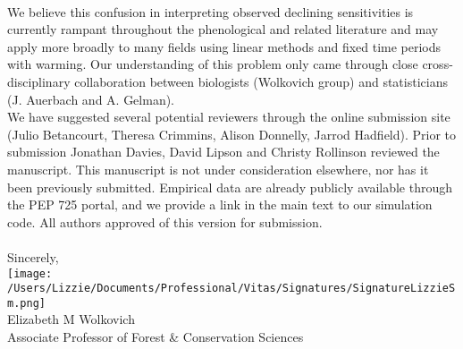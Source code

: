 \documentclass[11pt,a4paper]{article}
\begin{document}
\vspace{1.5ex}\\
We believe this confusion in interpreting observed declining sensitivities is currently rampant throughout the phenological \citep[e.g.,][]{fu2015,Samplonius:2018aa,vitasse2018,meng2020} and related literature \citep[e.g.,][]{piao2017} and may apply more broadly to many fields using linear methods and fixed time periods with warming. Our understanding of this problem only came through close cross-disciplinary collaboration between biologists (Wolkovich group) and statisticians (J. Auerbach and A. Gelman). 
\vspace{1.5ex}\\
We have suggested several potential reviewers through the online submission site (Julio Betancourt, Theresa Crimmins, Alison Donnelly,  Jarrod Hadfield). Prior to submission Jonathan Davies, David Lipson and Christy Rollinson reviewed the manuscript. This manuscript is not under consideration elsewhere, nor has it been previously submitted. Empirical data are already publicly available through the PEP 725 portal, and we provide a link in the main text to our simulation code. All authors approved of this version for submission. \\
\vspace{1.5ex}\\
Sincerely,\\

\texttt{[image: /Users/Lizzie/Documents/Professional/Vitas/Signatures/SignatureLizzieSm.png]} \\

\noindent Elizabeth M Wolkovich\\
Associate Professor of Forest \& Conservation Sciences\\ 


\end{document}
